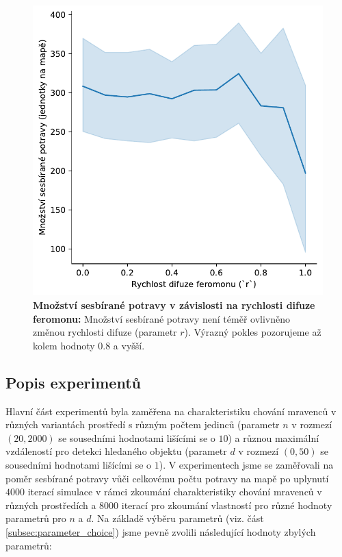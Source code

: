 \documentclass[10pt,a4paper,twocolumn]{article}
\begin{document}
\begin{figure}[tb]
  \centering
  \includegraphics[width=0.9\linewidth]{images/grid_search_2_difusion.pdf}
  \caption{\textbf{Množství sesbírané potravy v závislosti na rychlosti difuze feromonu: }
  Množství sesbírané potravy není téměř ovlivněno změnou rychlosti 
  difuze (parametr $r$). Výrazný pokles pozorujeme až kolem hodnoty $0.8$ 
  a vyšší.}
  \label{fig:grid_search_2_difusion}
\end{figure}


\subsection{Popis experimentů}
\label{subsec:experiment_describtion} 
Hlavní část experimentů byla zaměřena na charakteristiku chování mravenců v
různých variantách prostředí s různým počtem jedinců (parametr $n$ v rozmezí 
$(20, 2000)$ se sousedními hodnotami lišícími se o $10$) a různou 
maximální vzdáleností pro detekci hledaného objektu 
(parametr $d$ v rozmezí $(0, 50)$ se sousedními hodnotami lišícími se o $1$). 
V experimentech jsme se zaměřovali na poměr sesbírané potravy vůči celkovému 
počtu potravy na mapě po uplynutí
$4000$ iterací simulace v rámci zkoumání charakteristiky chování mravenců
v různých prostředích a $8000$ iterací pro zkoumání vlastností pro různé hodnoty
parametrů pro $n$ a $d$. Na základě výběru parametrů 
(viz. část \ref{subsec:parameter_choice}) jsme 
pevně zvolili následující hodnoty zbylých parametrů:
\end{document}
